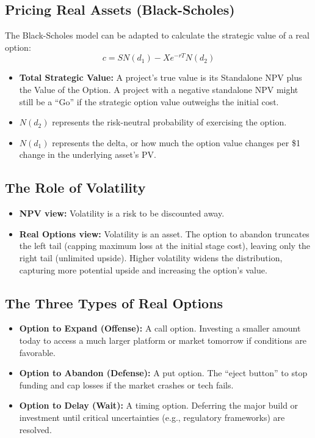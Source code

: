 \subsection{Pricing Real Assets (Black-Scholes)}
The Black-Scholes model can be adapted to calculate the strategic value of a
real option: $$ c = S N(d_1) - X e^{-rT} N(d_2) $$
\begin{itemize}
    \item \textbf{Total Strategic Value:} A project's true value is its Standalone NPV plus the
          Value of the Option. A project with a negative standalone NPV might still be a
          ``Go'' if the strategic option value outweighs the initial cost.
    \item $N(d_2)$ represents the risk-neutral probability of exercising the option.
    \item $N(d_1)$ represents the delta, or how much the option value changes per \$1 change in the underlying asset's PV.
\end{itemize}

\subsection{The Role of Volatility}
\begin{itemize}
    \item \textbf{NPV view:} Volatility is a risk to be discounted away.
    \item \textbf{Real Options view:} Volatility is an asset. The option to abandon truncates the
          left tail (capping maximum loss at the initial stage cost), leaving only the
          right tail (unlimited upside). Higher volatility widens the distribution,
          capturing more potential upside and increasing the option's value.
\end{itemize}

\subsection{The Three Types of Real Options}
\begin{itemize}
    \item \textbf{Option to Expand (Offense):} A call option. Investing a smaller amount today to
          access a much larger platform or market tomorrow if conditions are favorable.
    \item \textbf{Option to Abandon (Defense):} A put option. The ``eject button'' to stop
          funding and cap losses if the market crashes or tech fails.
    \item \textbf{Option to Delay (Wait):} A timing option. Deferring the major build or
          investment until critical uncertainties (e.g., regulatory frameworks) are
          resolved.
\end{itemize}

